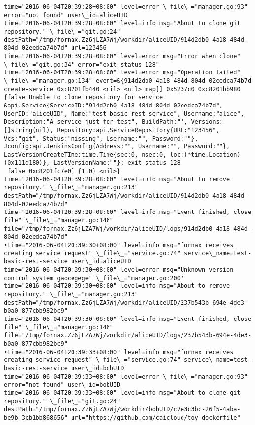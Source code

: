 \begin{lstlisting}[caption={Fornax功能性测试日志}]
time="2016-06-04T20:39:28+08:00" level=error \_file\_="manager.go:93" error="not found" user\_id=aliceUID 
time="2016-06-04T20:39:28+08:00" level=info msg="About to clone git repository." \_file\_="git.go:24" destPath="/tmp/fornax.Zz6jLZA7Wj/workdir/aliceUID/914d2db0-4a18-484d-804d-02eedca74b7d" url=123456 
time="2016-06-04T20:39:28+08:00" level=error msg="Error when clone" \_file\_="git.go:34" error="exit status 128" 
time="2016-06-04T20:39:28+08:00" level=error msg="Operation failed" \_file\_="manager.go:134" event=&{914d2db0-4a18-484d-804d-02eedca74b7d create-service 0xc8201fb440 <nil> <nil> map[] 0x5237c0 0xc8201bb980 {false Unable to clone repository for service &api.Service{ServiceID:"914d2db0-4a18-484d-804d-02eedca74b7d", UserID:"aliceUID", Name:"test-basic-rest-service", Username:"alice", Description:"A service just for test", BuildPath:"", Versions:[]string(nil), Repository:api.ServiceRepository{URL:"123456", Vcs:"git", Status:"missing", Username:"", Password:""}, Jconfig:api.JenkinsConfig{Address:"", Username:"", Password:""}, LastVersionCreateTIme:time.Time{sec:0, nsec:0, loc:(*time.Location)(0x111d180)}, LastVersionName:""}: exit status 128
 false 0xc8201fc7e0} {1 0} <nil>} 
time="2016-06-04T20:39:28+08:00" level=info msg="About to remove repository." \_file\_="manager.go:213" destPath="/tmp/fornax.Zz6jLZA7Wj/workdir/aliceUID/914d2db0-4a18-484d-804d-02eedca74b7d" 
time="2016-06-04T20:39:28+08:00" level=info msg="Event finished, close file" \_file\_="manager.go:146" file="/tmp/fornax.Zz6jLZA7Wj/workdir/aliceUID/logs/914d2db0-4a18-484d-804d-02eedca74b7d" 
•time="2016-06-04T20:39:30+08:00" level=info msg="fornax receives creating service request" \_file\_="service.go:74" service\_name=test-basic-rest-service user\_id=aliceUID 
time="2016-06-04T20:39:30+08:00" level=error msg="Unknown version control system gaocegege" \_file\_="manager.go:200" 
time="2016-06-04T20:39:30+08:00" level=info msg="About to remove repository." \_file\_="manager.go:213" destPath="/tmp/fornax.Zz6jLZA7Wj/workdir/aliceUID/237b543b-694e-4de3-b0a0-877cbb982bc9" 
time="2016-06-04T20:39:30+08:00" level=info msg="Event finished, close file" \_file\_="manager.go:146" file="/tmp/fornax.Zz6jLZA7Wj/workdir/aliceUID/logs/237b543b-694e-4de3-b0a0-877cbb982bc9" 
•time="2016-06-04T20:39:33+08:00" level=info msg="fornax receives creating service request" \_file\_="service.go:74" service\_name=test-basic-rest-service user\_id=bobUID 
time="2016-06-04T20:39:33+08:00" level=error \_file\_="manager.go:93" error="not found" user\_id=bobUID 
time="2016-06-04T20:39:33+08:00" level=info msg="About to clone git repository." \_file\_="git.go:24" destPath="/tmp/fornax.Zz6jLZA7Wj/workdir/bobUID/c7e3c3bc-26f5-4aba-be9b-3cb1bb868656" url="https://github.com/caicloud/toy-dockerfile" 

\end{lstlisting}
